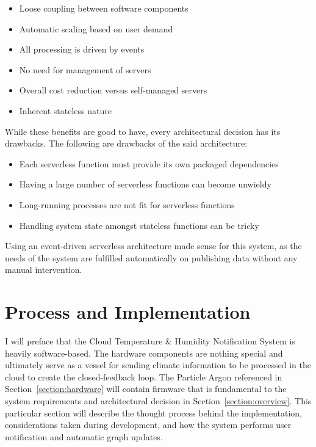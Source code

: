 \documentclass{article}
\begin{document}
\begin{itemize}
    \item Loose coupling between software components
    \item Automatic scaling based on user demand
    \item All processing is driven by events
    \item No need for management of servers
    \item Overall cost reduction versus self-managed servers
    \item Inherent stateless nature
\end{itemize}

While these benefits are good to have, every architectural decision has its drawbacks. The following  are drawbacks of the said architecture:

\begin{itemize}
    \item Each serverless function must provide its own packaged dependencies
    \item Having a large number of serverless functions can become unwieldy
    \item Long-running processes are not fit for serverless functions
    \item Handling system state amongst stateless functions can be tricky
\end{itemize}

Using an event-driven serverless architecture made sense for this system, as the needs of the system are fulfilled automatically on publishing data without any manual intervention.

\section{Process and Implementation}
I will preface that the Cloud Temperature \& Humidity Notification System is heavily software-based. The hardware components are nothing special and ultimately serve as a vessel for sending climate information to be processed in the cloud to create the closed-feedback loop. The Particle Argon referenced in Section~\ref{section:hardware} will contain firmware that is fundamental to the system requirements and architectural decision in Section~\ref{section:overview}. This particular section will describe the thought process behind the implementation, considerations taken during development, and how the system performs user notification and automatic graph updates.
\end{document}
